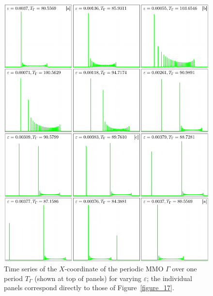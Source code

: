 \documentclass{ws-ijbc}
\begin{document}
\begin{figure}[t!]
\centering
\includegraphics[]{./figures/MKMO_18.pdf}
\caption{Time series of the $X$-coordinate of the periodic MMO $\Gamma$ over one period $T_\Gamma$ (shown at top of panels) for varying $\varepsilon$; the individual panels correspond directly to those of Figure~\ref{figure_17}.}
\label{figure_18}
\end{figure}

\clearpage
\end{document}
